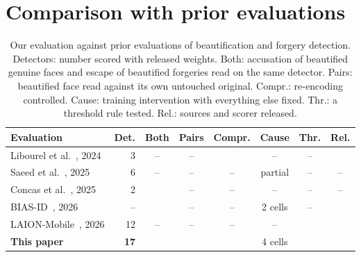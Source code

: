 \documentclass[10pt]{article}
\newcommand{\cmark}{\checkmark}
\newcommand{\xmark}{--}
\begin{document}
\section{Comparison with prior evaluations}
\label{sec:compare}
\begin{table}[H]
\centering
\caption{Our evaluation against prior evaluations of beautification and forgery detection. Detectors: number scored with
released weights. Both: accusation of beautified genuine faces and escape of beautified forgeries read on the same detector.
Pairs: beautified face read against its own untouched original. Compr.: re-encoding controlled. Cause: training intervention
with everything else fixed. Thr.: a threshold rule tested. Rel.: sources and scorer released.}
\label{tab:compare}
\footnotesize
\setlength{\tabcolsep}{3.5pt}
\begin{tabular}{@{}l r c c c c c c@{}}
\toprule
Evaluation & Det. & Both & Pairs & Compr. & Cause & Thr. & Rel. \\
\midrule
Libourel et al.~\cite{libourel2024}, 2024 & 3 & \xmark & \xmark & \cmark & \xmark & \xmark & \cmark \\
Saeed et al.~\cite{saeed2025}, 2025 & 6 & \xmark & \xmark & \xmark & partial & \xmark & \xmark \\
Concas et al.~\cite{concas2025}, 2025 & 2 & \cmark & \xmark & \xmark & \xmark & \xmark & \xmark \\
BIAS-ID~\cite{ricker2026biasid}, 2026 & -- & \cmark & \xmark & \xmark & 2 cells & \xmark & \cmark \\
LAION-Mobile~\cite{laionmobile2026}, 2026 & 12 & \xmark & \xmark & \xmark & \xmark & \cmark & \cmark \\
\textbf{This paper} & \textbf{17} & \cmark & \cmark & \cmark & 4 cells & \cmark & \cmark \\
\bottomrule
\end{tabular}
\end{table}
\end{document}
